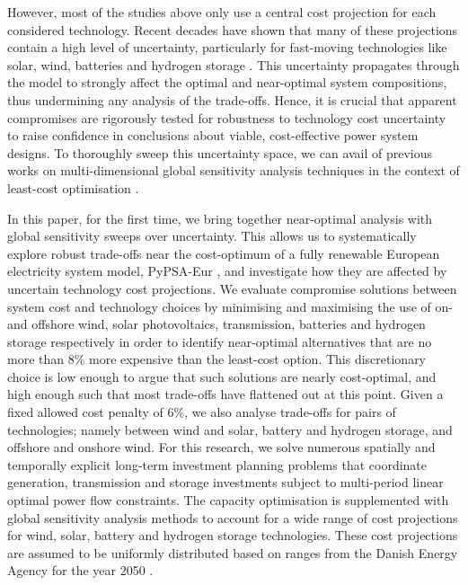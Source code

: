 However, most of the studies above only use a central cost projection for each
considered technology. Recent decades have shown that many of these
projections contain a high level of uncertainty, particularly for fast-moving
technologies like solar, wind, batteries and hydrogen storage
\cite{ludererImpactDeclining2021,victoriaSolarPhotovoltaics2021,jaxa-rozenSourcesUncertainty2021}. This
uncertainty propagates through the model to strongly affect the optimal and
near-optimal system compositions, thus undermining any analysis of the
trade-offs. Hence, it is crucial that apparent compromises are rigorously tested
for robustness to technology cost uncertainty to raise confidence in conclusions
about viable, cost-effective power system designs. To thoroughly sweep this
uncertainty space, we can avail of previous works on
multi-dimensional global sensitivity analysis techniques in the context of
least-cost optimisation \cite{trondle_trade-offs_2020,
mavromatidis_uncertainty_2018, pizarro-alonso_uncertainties_2019,
fais_impact_2016, usher_value_2015}.


In this paper, for the first time, we bring together near-optimal analysis with
global sensitivity sweeps over uncertainty. This allows us to systematically
explore robust trade-offs near the cost-optimum of a fully renewable European
electricity system model, PyPSA-Eur \cite{pypsaeur}, and investigate how they
are affected by uncertain technology cost projections. We evaluate compromise
solutions between system cost and technology choices by minimising and
maximising the use of on- and offshore wind, solar photovoltaics, transmission,
batteries and hydrogen storage respectively in order to identify near-optimal
alternatives that are no more than 8\% more expensive than the least-cost
option. This discretionary choice is low enough to argue that such solutions are
nearly cost-optimal, and high enough such that most trade-offs have flattened
out at this point. Given a fixed allowed cost penalty of 6\%, we also analyse
trade-offs for pairs of technologies; namely between wind and solar, battery and
hydrogen storage, and offshore and onshore wind. For this research, we solve
numerous spatially and temporally explicit long-term investment planning
problems that coordinate generation, transmission and storage investments
subject to multi-period linear optimal power flow constraints. The capacity
optimisation is supplemented with global sensitivity analysis methods to account
for a wide range of cost projections for wind, solar, battery and hydrogen
storage technologies. These cost projections are assumed to be uniformly
distributed based on ranges from the Danish Energy Agency for the year 2050
\cite{DEA}.

